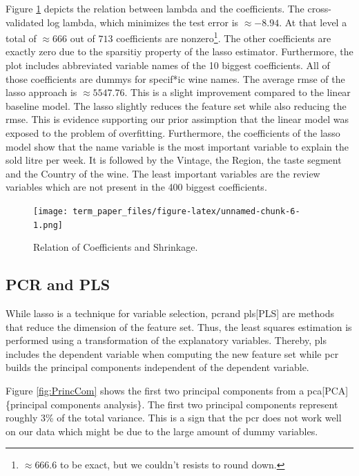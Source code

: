 \documentclass[11pt,]{article}
\let\rmarkdownfootnote\footnote%
\def\footnote{\protect\rmarkdownfootnote}
\begin{document}
Figure \ref{fig:CoefLamb} depicts the relation between lambda and the
coefficients. The cross-validated log lambda, which minimizes the test
error is \(\approx -8.94\). At that level a total of \(\approx 666\) out
of \(713\) coefficients are
nonzero\footnote{$\approx 666.6$ to be exact, but we couldn't resists to round down.}.
The other coefficients are exactly zero due to the sparsitiy property of
the \ac{lasso} estimator. Furthermore, the plot includes abbreviated
variable names of the 10 biggest coefficients. All of those coefficients
are dummys for specif*ic wine names. The average \ac{rmse} of the
\ac{lasso} approach is \(\approx 5547.76\). This is a slight improvement
compared to the linear baseline model. The \ac{lasso} slightly reduces
the feature set while also reducing the \ac{rmse}. This is evidence
supporting our prior assimption that the linear model was exposed to the
problem of overfitting. Furthermore, the coefficients of the \ac{lasso}
model show that the name variable is the most important variable to
explain the sold litre per week. It is followed by the Vintage, the
Region, the taste segment and the Country of the wine. The least
important variables are the review variables which are not present in
the 400 biggest coefficients.

\begin{figure}
\centering
\texttt{[image: term\_paper\_files/figure-latex/unnamed-chunk-6-1.png]}
\caption{\label{fig:CoefLamb}Relation of Coefficients and Shrinkage.}
\end{figure}

\hypertarget{pcr-and-pls}{%
\subsection{PCR and PLS}\label{pcr-and-pls}}

While \ac{lasso} is a technique for variable selection, \ac{pcr}and
\ac{pls}{[}PLS{]} are methods that reduce the dimension of the feature
set. Thus, the least squares estimation is performed using a
transformation of the explanatory variables. Thereby, \ac{pls} includes
the dependent variable when computing the new feature set while \ac{pcr}
builds the principal components independent of the dependent variable.

Figure \ref{fig:PrincCom} shows the first two principal components from
a \ac{pca}{[}PCA{]}\{principal components analysis\}. The first two
principal components represent roughly 3\% of the total variance. This
is a sign that the \ac{pcr} does not work well on our data which might
be due to the large amount of dummy variables.
\end{document}
